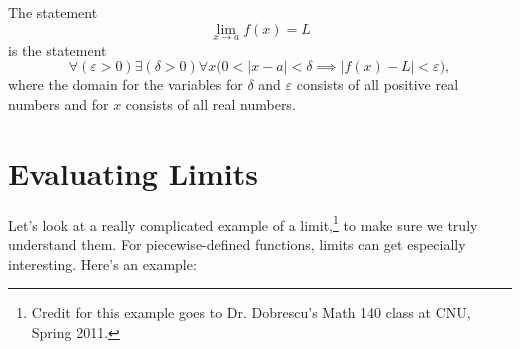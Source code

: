 The statement
\[ \lim_{x \to a} f(x) = L \]
is the statement
\begin{equation}
  \forall (\varepsilon > 0) \exists (\delta>0) \forall x \Big(0 < | x -a| < \delta \implies
  \big|f(x)-L\big| < \varepsilon\Big),
  \label{eq:e_d_limit}
\end{equation}
where the domain for the variables for $\delta$ and $\varepsilon$ consists of
all positive real numbers and for $x$ consists of all real
numbers.

\section{Evaluating Limits}
Let's look at a really complicated example of a limit,\footnote{Credit for this example goes to Dr. Dobrescu's Math 140 class at CNU, Spring 2011.} to make sure we truly understand them.
For piecewise-defined functions, limits can get especially interesting. Here's an example:
